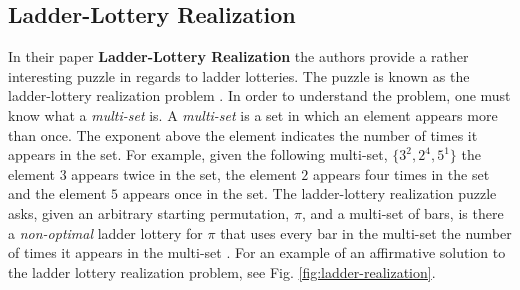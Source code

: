 

\subsection{Ladder-Lottery Realization}

In their paper \textbf{Ladder-Lottery Realization} the authors provide 
a rather interesting puzzle in regards to ladder lotteries. The puzzle 
is known as the ladder-lottery realization problem \cite{A3}. In order to understand
the problem, one must know what a \emph{multi-set} is. A \emph{multi-set}
is a set in which an element appears more than once. The exponent 
above the element indicates the number of times it appears in the set.
For example, given the following multi-set, $\{3^{2}, 2^{4}, 5^{1}\}$ 
the element $3$ appears twice in the set, the element $2$ appears four times
in the set and the element $5$ appears once in the set.
The ladder-lottery realization puzzle asks, given an arbitrary starting permutation, $\pi$, 
and a multi-set of bars, 
is there a \emph{non-optimal} ladder lottery for $\pi$
that uses every bar in the multi-set the number 
of times it appears in the  multi-set \cite{A3}. 
For an example of an affirmative solution to the ladder lottery realization problem, see Fig. \ref{fig:ladder-realization}.

